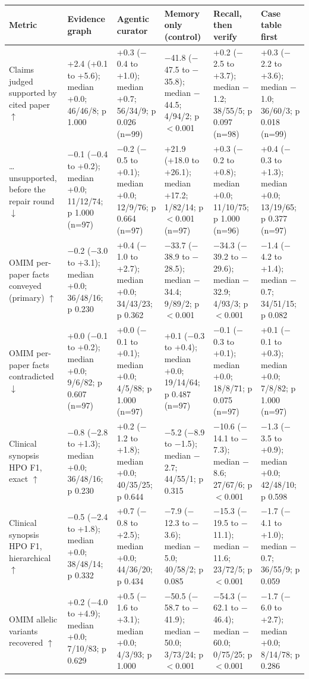 \documentclass{article} %
\begin{document}
\begin{table}
\begin{tabularx}{\linewidth}{>{\raggedright\arraybackslash}p{3.4cm}>{\centering\arraybackslash}X>{\centering\arraybackslash}X>{\centering\arraybackslash}X>{\centering\arraybackslash}X>{\centering\arraybackslash}X}
\toprule
Metric & Evidence graph & Agentic curator & Memory only (control) & Recall, then verify & Case table first \\
\midrule
Claims judged supported by cited paper $\uparrow$ & +2.4 (+0.1 to +5.6); median +0.0; 46/46/8; p 1.000 & +0.3 ($-$0.4 to +1.0); median +0.7; 56/34/9; p 0.026 (n=99) & $-$41.8 ($-$47.5 to $-$35.8); median $-$44.5; 4/94/2; p $<$0.001 & +0.2 ($-$2.5 to +3.7); median $-$1.2; 38/55/5; p 0.097 (n=98) & +0.3 ($-$2.2 to +3.6); median $-$1.0; 36/60/3; p 0.018 (n=99) \\
\ldots{} unsupported, before the repair round $\downarrow$ & $-$0.1 ($-$0.4 to +0.2); median +0.0; 11/12/74; p 1.000 (n=97) & $-$0.2 ($-$0.5 to +0.1); median +0.0; 12/9/76; p 0.664 (n=97) & +21.9 (+18.0 to +26.1); median +17.2; 1/82/14; p $<$0.001 (n=97) & +0.3 ($-$0.2 to +0.8); median +0.0; 11/10/75; p 1.000 (n=96) & +0.4 ($-$0.3 to +1.3); median +0.0; 13/19/65; p 0.377 (n=97) \\
OMIM per-paper facts conveyed (primary) $\uparrow$ & $-$0.2 ($-$3.0 to +3.1); median +0.0; 36/48/16; p 0.230 & +0.4 ($-$1.0 to +2.7); median +0.0; 34/43/23; p 0.362 & $-$33.7 ($-$38.9 to $-$28.5); median $-$34.4; 9/89/2; p $<$0.001 & $-$34.3 ($-$39.2 to $-$29.6); median $-$32.9; 4/93/3; p $<$0.001 & $-$1.4 ($-$4.2 to +1.4); median $-$0.7; 34/51/15; p 0.082 \\
OMIM per-paper facts contradicted $\downarrow$ & +0.0 ($-$0.1 to +0.2); median +0.0; 9/6/82; p 0.607 (n=97) & +0.0 ($-$0.1 to +0.1); median +0.0; 4/5/88; p 1.000 (n=97) & +0.1 ($-$0.3 to +0.4); median +0.0; 19/14/64; p 0.487 (n=97) & $-$0.1 ($-$0.3 to +0.1); median +0.0; 18/8/71; p 0.075 (n=97) & +0.1 ($-$0.1 to +0.3); median +0.0; 7/8/82; p 1.000 (n=97) \\
Clinical synopsis HPO F1, exact $\uparrow$ & $-$0.8 ($-$2.8 to +1.3); median +0.0; 36/48/16; p 0.230 & +0.2 ($-$1.2 to +1.8); median +0.0; 40/35/25; p 0.644 & $-$5.2 ($-$8.9 to $-$1.5); median $-$2.7; 44/55/1; p 0.315 & $-$10.6 ($-$14.1 to $-$7.3); median $-$8.6; 27/67/6; p $<$0.001 & $-$1.3 ($-$3.5 to +0.9); median +0.0; 42/48/10; p 0.598 \\
Clinical synopsis HPO F1, hierarchical $\uparrow$ & $-$0.5 ($-$2.4 to +1.8); median +0.0; 38/48/14; p 0.332 & +0.7 ($-$0.8 to +2.5); median +0.0; 44/36/20; p 0.434 & $-$7.9 ($-$12.3 to $-$3.6); median $-$5.0; 40/58/2; p 0.085 & $-$15.3 ($-$19.5 to $-$11.1); median $-$11.6; 23/72/5; p $<$0.001 & $-$1.7 ($-$4.1 to +1.0); median $-$0.7; 36/55/9; p 0.059 \\
OMIM allelic variants recovered $\uparrow$ & +0.2 ($-$4.0 to +4.9); median +0.0; 7/10/83; p 0.629 & +0.5 ($-$1.6 to +3.1); median +0.0; 4/3/93; p 1.000 & $-$50.5 ($-$58.7 to $-$41.9); median $-$50.0; 3/73/24; p $<$0.001 & $-$54.3 ($-$62.1 to $-$46.4); median $-$60.0; 0/75/25; p $<$0.001 & $-$1.7 ($-$6.0 to +2.7); median +0.0; 8/14/78; p 0.286 \\

\end{tabularx}
\end{table}
\end{document}
